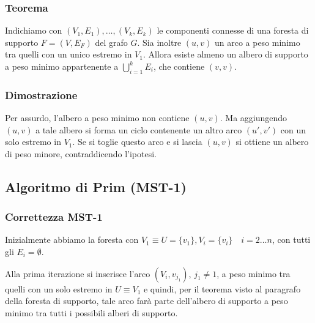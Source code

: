 \documentclass[../template]{subfiles}
\begin{document}
\subsubsection{Teorema}
Indichiamo con $(V_1, E_1),\ldots ,(V_k, E_k)$ le componenti connesse di una foresta di supporto
$F = (V, E_F)$ del grafo $G$. Sia inoltre $(u, v)$ un arco a peso minimo tra quelli con un unico estremo
in $V_1$. Allora esiste almeno un albero di supporto a peso minimo appartenente a $\bigcup^k_{i=1} E_i$,
che contiene $(v, v)$.

\subsubsection{Dimostrazione}
Per assurdo, l'albero a peso minimo non contiene $(u, v)$. Ma aggiungendo $(u, v)$ a tale albero si forma un
ciclo contenente un altro arco $(u', v')$  con un solo estremo in $V_1$.
Se si toglie questo arco e si lascia $(u, v)$ si ottiene un albero di peso minore,
contraddicendo l'ipotesi.

\newpage
\subsection{Algoritmo di Prim (MST-1)}
\begin{center}
\end{center}

\subsubsection{Correttezza MST-1}
Inizialmente abbiamo la foresta con $V_1 \equiv U = \{v_1\}, V_i = \{v_i\} \quad i=2\ldots n$, con tutti gli $E_i = \emptyset$.

Alla prima iterazione si inserisce l'arco $(V_i, v_{j_1})$, $j_1 \neq 1$, a peso minimo tra quelli con un solo estremo in $U \equiv V_1$
e quindi, per il teorema visto al paragrafo della foresta di supporto, tale arco farà parte dell'albero di supporto a peso minimo
tra tutti i possibili alberi di supporto.
\end{document}
